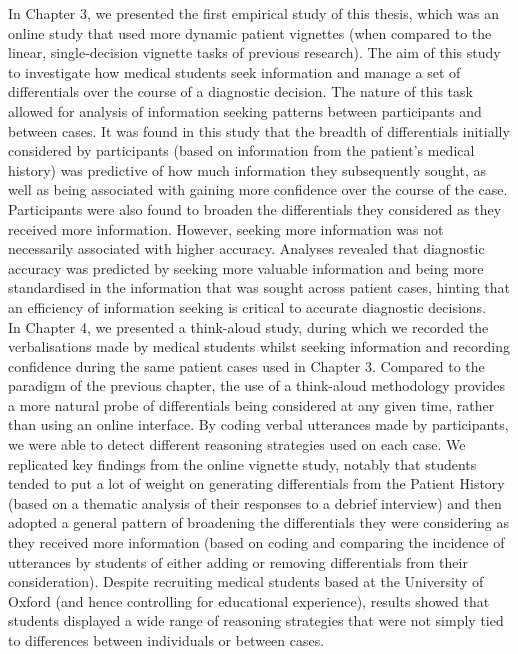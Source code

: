 \documentclass[a4paper, nobind]{templates/ociamthesis}
\begin{document}
In Chapter 3, we presented the first empirical study of this thesis, which was an online study that used more dynamic patient vignettes (when compared to the linear, single-decision vignette tasks of previous research). The aim of this study to investigate how medical students seek information and manage a set of differentials over the course of a diagnostic decision. The nature of this task allowed for analysis of information seeking patterns between participants and between cases. It was found in this study that the breadth of differentials initially considered by participants (based on information from the patient's medical history) was predictive of how much information they subsequently sought, as well as being associated with gaining more confidence over the course of the case. Participants were also found to broaden the differentials they considered as they received more information. However, seeking more information was not necessarily associated with higher accuracy. Analyses revealed that diagnostic accuracy was predicted by seeking more valuable information and being more standardised in the information that was sought across patient cases, hinting that an efficiency of information seeking is critical to accurate diagnostic decisions.\\

In Chapter 4, we presented a think-aloud study, during which we recorded the verbalisations made by medical students whilst seeking information and recording confidence during the same patient cases used in Chapter 3. Compared to the paradigm of the previous chapter, the use of a think-aloud methodology provides a more natural probe of differentials being considered at any given time, rather than using an online interface. By coding verbal utterances made by participants, we were able to detect different reasoning strategies used on each case. We replicated key findings from the online vignette study, notably that students tended to put a lot of weight on generating differentials from the Patient History (based on a thematic analysis of their responses to a debrief interview) and then adopted a general pattern of broadening the differentials they were considering as they received more information (based on coding and comparing the incidence of utterances by students of either adding or removing differentials from their consideration). Despite recruiting medical students based at the University of Oxford (and hence controlling for educational experience), results showed that students displayed a wide range of reasoning strategies that were not simply tied to differences between individuals or between cases.\\
\end{document}
